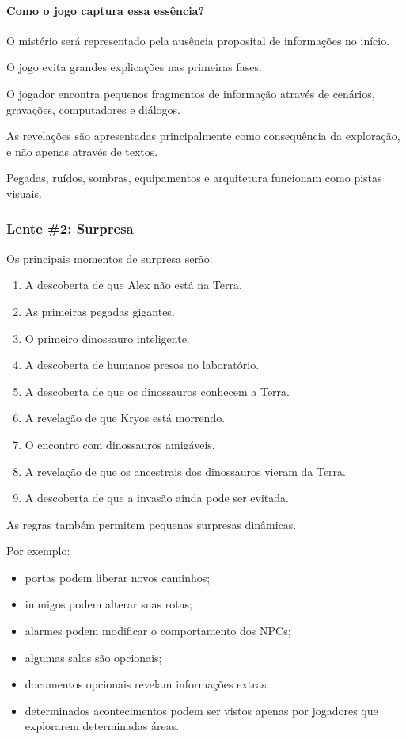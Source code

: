 \documentclass[12pt,a4paper]{article}
\begin{document}
\paragraph{Como o jogo captura essa essência?}

O mistério será representado pela ausência proposital de informações
no início.

O jogo evita grandes explicações nas primeiras fases.

O jogador encontra pequenos fragmentos de informação através de
cenários, gravações, computadores e diálogos.

As revelações são apresentadas principalmente como consequência da
exploração, e não apenas através de textos.

Pegadas, ruídos, sombras, equipamentos e arquitetura funcionam como
pistas visuais.


\subsubsection*{Lente \#2: Surpresa}

Os principais momentos de surpresa serão:

\begin{enumerate}
    \item A descoberta de que Alex não está na Terra.
    \item As primeiras pegadas gigantes.
    \item O primeiro dinossauro inteligente.
    \item A descoberta de humanos presos no laboratório.
    \item A descoberta de que os dinossauros conhecem a Terra.
    \item A revelação de que Kryos está morrendo.
    \item O encontro com dinossauros amigáveis.
    \item A revelação de que os ancestrais dos dinossauros vieram da Terra.
    \item A descoberta de que a invasão ainda pode ser evitada.
\end{enumerate}

As regras também permitem pequenas surpresas dinâmicas.

Por exemplo:

\begin{itemize}
    \item portas podem liberar novos caminhos;
    \item inimigos podem alterar suas rotas;
    \item alarmes podem modificar o comportamento dos NPCs;
    \item algumas salas são opcionais;
    \item documentos opcionais revelam informações extras;
    \item determinados acontecimentos podem ser vistos apenas por jogadores
    que explorarem determinadas áreas.
\end{itemize}
\end{document}
